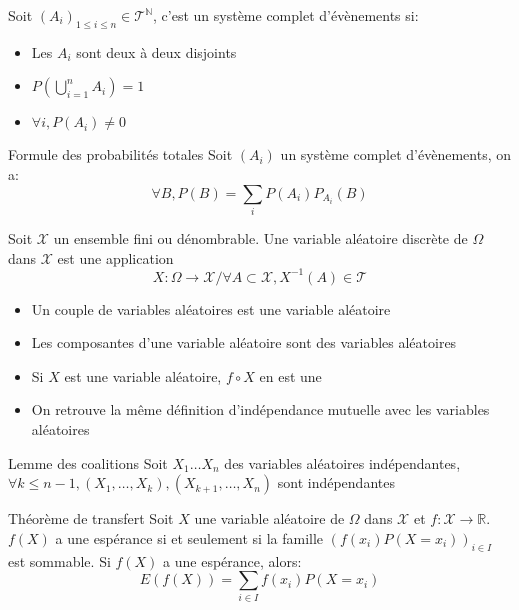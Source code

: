 \documentclass[french, a4paper, 10pt, twocolumn]{article}
\newcommand{\N}{\mathbb{N}}   %
\newcommand{\R}{\mathbb{R}}   %
\begin{document}
\begin{definition}
  Soit \((A_i)_{1 \leqslant i \leqslant n} \in \mathcal{T}^{\N}\), c'est un système complet d'évènements si:
  \begin{itemize}
    \item Les \(A_i\) sont deux à deux disjoints
    \item \(P\left(\bigcup_{i=1}^{n}A_i\right)=1\)
    \item \(\forall i, P(A_i)\neq 0\)
  \end{itemize}
\end{definition}

\begin{theoreme}{Formule des probabilités totales}
  Soit $(A_i)$ un système complet d'évènements, on a:
  \[\forall B, P(B)=\sum_{i}P(A_i)P_{A_i}(B)\]
\end{theoreme}

\begin{definition}
  Soit \(\mathcal{X}\) un ensemble fini ou dénombrable.
  Une variable aléatoire discrète de \(\Omega\) dans \(\mathcal{X}\) est une application
  \[X: \Omega \rightarrow \mathcal{X} / \forall A \subset \mathcal{X}, X^{-1}(A) \in \mathcal{T}\]

  \tcblower
  \begin{itemize}
    \item Un couple de variables aléatoires est une variable aléatoire
    \item Les composantes d'une variable aléatoire sont des variables aléatoires
    \item Si \(X\) est une variable aléatoire, \(f\circ X\) en est une
    \item On retrouve la même définition d'indépendance mutuelle avec les variables aléatoires
  \end{itemize}
\end{definition}

\begin{theoreme}{Lemme des coalitions}
  Soit \(X_1\dots X_n\) des variables aléatoires indépendantes,
  \(\forall k \leqslant n-1, (X_1,\dots,X_k),(X_{k+1},\dots,X_n)\) sont indépendantes
\end{theoreme}

\begin{theoreme}{Théorème de transfert}
  Soit \(X\) une variable aléatoire de \(\Omega\) dans \(\mathcal{X}\) et \(f: \mathcal{X} \rightarrow \R\).
  \(f(X)\) a une espérance si et seulement si la famille \((f(x_i)P(X=x_i))_{i\in I}\) est sommable.
  Si \(f(X)\) a une espérance, alors:
  \[E(f(X))=\sum_{i\in I}f(x_i)P(X=x_i)\]
\end{theoreme}
\end{document}
